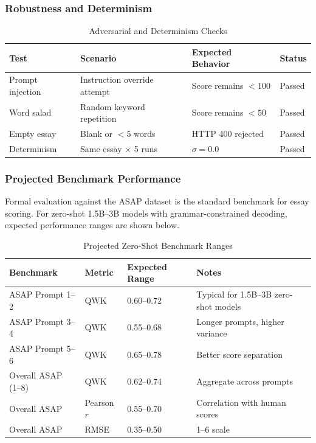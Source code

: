 \subsubsection{Robustness and Determinism}
\renewcommand{\arraystretch}{1.15}
\setlength{\tabcolsep}{4pt}
\begin{table}[H]
\centering
\caption{Adversarial and Determinism Checks}
\label{tab:essay-robustness}
\begin{tabular}{|p{3.2cm}|p{4.4cm}|p{3.2cm}|p{2.4cm}|}
\hline
\textbf{Test} & \textbf{Scenario} & \textbf{Expected Behavior} & \textbf{Status} \\ \hline
Prompt injection & Instruction override attempt & Score remains $<100$ & Passed \\ \hline
Word salad & Random keyword repetition & Score remains $<50$ & Passed \\ \hline
Empty essay & Blank or $<5$ words & HTTP 400 rejected & Passed \\ \hline
Determinism & Same essay $\times$ 5 runs & $\sigma = 0.0$ & Passed \\ \hline
\end{tabular}
\end{table}

\subsubsection{Projected Benchmark Performance}
Formal evaluation against the ASAP dataset is the standard benchmark for essay scoring. For zero-shot 1.5B--3B models with grammar-constrained decoding, expected performance ranges are shown below.

\renewcommand{\arraystretch}{1.15}
\setlength{\tabcolsep}{4pt}
\begin{table}[H]
\centering
\caption{Projected Zero-Shot Benchmark Ranges}
\label{tab:essay-qwk-projection}
\begin{tabular}{|p{4.2cm}|p{2.4cm}|p{3.0cm}|p{3.4cm}|}
\hline
\textbf{Benchmark} & \textbf{Metric} & \textbf{Expected Range} & \textbf{Notes} \\ \hline
ASAP Prompt 1--2 & QWK & 0.60--0.72 & Typical for 1.5B--3B zero-shot models \\ \hline
ASAP Prompt 3--4 & QWK & 0.55--0.68 & Longer prompts, higher variance \\ \hline
ASAP Prompt 5--6 & QWK & 0.65--0.78 & Better score separation \\ \hline
Overall ASAP (1--8) & QWK & 0.62--0.74 & Aggregate across prompts \\ \hline
Overall ASAP & Pearson $r$ & 0.55--0.70 & Correlation with human scores \\ \hline
Overall ASAP & RMSE & 0.35--0.50 & 1--6 scale \\ \hline
\end{tabular}
\end{table}

